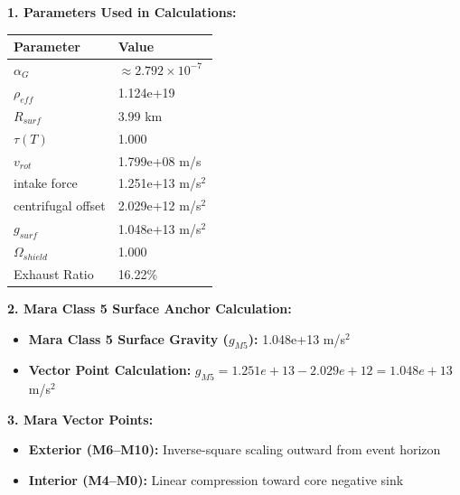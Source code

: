 \documentclass[11pt, a4paper]{article}
\begin{document}
\vspace{0.5em}
\noindent \textbf{1. Parameters Used in Calculations:}
\begin{center}
  \begin{tabular}{|l|l|}
    \hline
    \textbf{Parameter} & \textbf{Value} \\ \hline
    $\alpha_G$ & $\approx 2.792 \times 10^{-7}$ \\ \hline
    $\rho_{eff}$ & 1.124e+19 \\ \hline
    $R_{surf}$ & 3.99 km \\ \hline
    $\tau(T)$ & 1.000 \\ \hline
    $v_{rot}$ & 1.799e+08 m/s \\ \hline
    intake force & 1.251e+13 m/s$^2$ \\ \hline
    centrifugal offset & 2.029e+12 m/s$^2$ \\ \hline
    $g_{surf}$ & 1.048e+13 m/s$^2$ \\ \hline
    $\Omega_{shield}$ & 1.000 \\ \hline
    Exhaust Ratio & 16.22\% \\ \hline
  \end{tabular}
\end{center}

\vspace{0.5em}
\noindent \textbf{2. Mara Class 5 Surface Anchor Calculation:}
\begin{itemize}
  \item \textbf{Mara Class 5 Surface Gravity ($g_{M5}$):} 1.048e+13 m/s$^2$
  \item \textbf{Vector Point Calculation:} $g_{M5} = 1.251e+13 - 2.029e+12 = 1.048e+13$ m/s$^2$
\end{itemize}

\vspace{0.5em}
\noindent \textbf{3. Mara Vector Points:}
\begin{itemize}
  \item \textbf{Exterior (M6--M10):} Inverse-square scaling outward from event horizon
  \item \textbf{Interior (M4--M0):} Linear compression toward core negative sink
\end{itemize}
\end{document}
